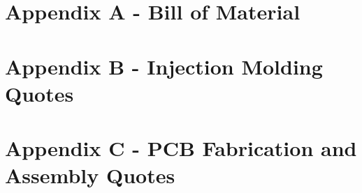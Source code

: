 

\section*{Appendix A - Bill of Material}

\bigskip











\pagebreak
\section*{Appendix B - Injection Molding Quotes}

\bigskip











\pagebreak
\section*{Appendix C - PCB Fabrication and Assembly Quotes}

\bigskip
